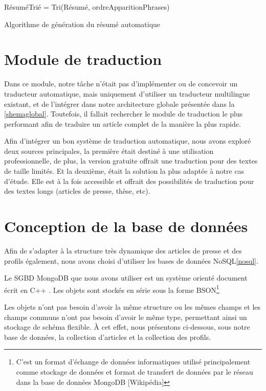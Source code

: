          \begin{algorithm2e}[H]
             \SetAlgoLined
             RésuméTrié = Tri(Résumé, ordreApparitionPhrases)\\
             \caption{Algorithme de génération du résumé automatique}
         \end{algorithm2e}

\section{Module de traduction}
Dans ce module, notre tâche n'était pas d'implémenter ou de concevoir un traducteur automatique, mais uniquement d'utiliser un traducteur multilingue existant, et de l'intégrer dans notre architecture globale présentée dans la \autoref{shemaglobal}. 
Toutefois, il fallait rechercher le module de traduction le plus performant afin de traduire un article complet de la manière la plus rapide.

Afin d'intégrer un bon système de traduction automatique, nous avons exploré deux sources principales, la première était destiné à une utilisation professionnelle, de plus, la version gratuite offrait une traduction pour des textes de taille limités. Et la deuxième, était la solution la plus adaptée à notre cas d'étude. Elle est à la fois accessible et offrait des possibilités de traduction pour des textes longs (articles de presse, thèse, etc). 

\section{Conception de la base de données}
Afin de s'adapter à la structure très dynamique des articles de presse et des profils également, nous avons choisi d'utiliser les bases de données NoSQL\ref{nosql}.

Le SGBD MongoDB que nous avons utiliser est un système orienté document écrit en C++ \cite{NOSQL3}. Les objets sont stockés en série sous la forme BSON\footnote{C'est un format d'échange de données informatiques utilisé principalement comme stockage de données et format de transfert de données par le réseau dans la base de données MongoDB [Wikipédia]}

Les objets n'ont pas besoin d'avoir la même structure ou les mêmes champs et les champs communs n'ont pas besoin d'avoir le même type, permettant ainsi un stockage de schéma flexible. À cet effet, nous présentons ci-dessous, sous notre base de données, la collection d'articles et la collection des profils.

